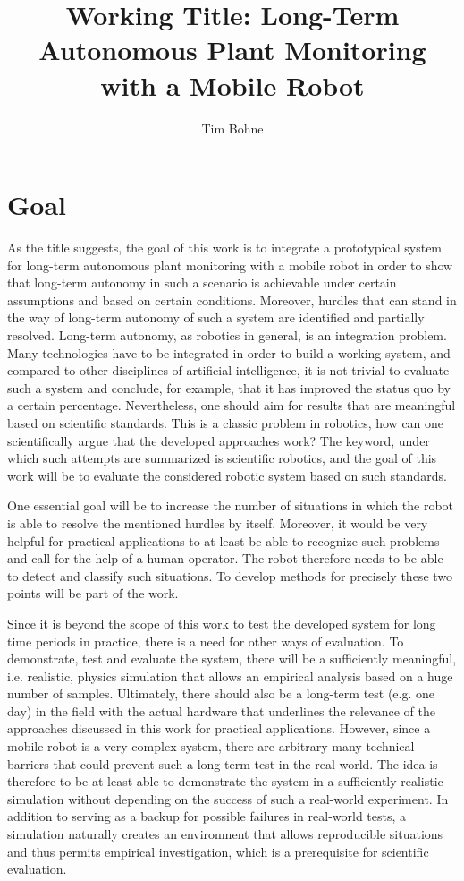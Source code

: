 \documentclass[german, master, expose, latin1]{base/thesis_KBS}
\begin{document}
\title{Working Title: Long-Term Autonomous Plant Monitoring with a Mobile Robot}
\author{Tim Bohne}

\generatetitle

\section{Goal}

As the title suggests, the goal of this work is to integrate a prototypical system for long-term autonomous plant monitoring with a mobile robot
in order to show that long-term autonomy in such a scenario is achievable under certain assumptions and based on certain conditions.
Moreover, hurdles that can stand in the way of long-term autonomy of such a system are identified and partially resolved.
Long-term autonomy, as robotics in general, is an integration problem. Many technologies have to be integrated in order to build a working system, and compared to
other disciplines of artificial intelligence, it is not trivial to evaluate such a system and conclude, for example, that it has improved the status quo by a certain percentage.
Nevertheless, one should aim for results that are meaningful based on scientific standards. This is a classic problem in robotics, how can one scientifically argue that the developed
approaches work? The keyword, under which such attempts are summarized is scientific robotics, and the goal of this work will be to evaluate the considered robotic 
system based on such standards.\newline

One essential goal will be to increase the number of situations in which the robot is able to resolve the mentioned hurdles by itself.
Moreover, it would be very helpful for practical applications to at least be able to recognize such problems and call for the help of a human operator.
The robot therefore needs to be able to detect and classify such situations. To develop methods for precisely these two points will be part of the work.\newline

Since it is beyond the scope of this work to test the developed system for long time periods in practice, there is a need for other ways of evaluation.
To demonstrate, test and evaluate the system, there will be a sufficiently meaningful, i.e. realistic, physics simulation that allows an empirical analysis based 
on a huge number of samples. Ultimately, there should also be a long-term test (e.g. one day) in the field with the actual hardware that underlines the relevance of 
the approaches discussed in this work for practical applications. However, since a mobile robot is a very complex system, there are arbitrary many technical barriers 
that could prevent such a long-term test in the real world. The idea is therefore to be at least able to demonstrate the system in a sufficiently realistic simulation 
without depending on the success of such a real-world experiment. In addition to serving as a backup for possible failures in real-world tests, a simulation naturally 
creates an environment that allows reproducible situations and thus permits empirical investigation, which is a prerequisite for scientific evaluation.
\end{document}
